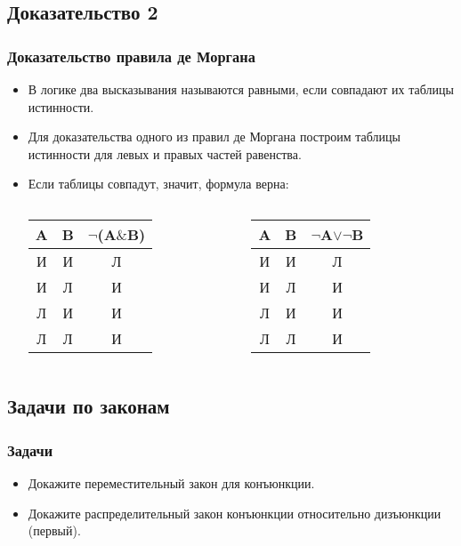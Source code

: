 \documentclass[compress,red]{beamer}
\begin{document}
\subsection{Доказательство 2}
\begin{frame}[fragile]
  \frametitle{Доказательство правила де Моргана}
  \begin{itemize}
    \item В логике два высказывания называются равными, если совпадают их таблицы истинности.
    \item Для доказательства одного из правил де Моргана построим таблицы истинности для левых и правых частей равенства.
    \item Если таблицы совпадут, значит, формула верна:


    \begin{columns}[c]
    \column{1.5in}
      \begin{tabular}{|c|c|c|}
        \hline
        A & B & ${\neg}$(A$\&$B) \\
        \hline
        И & И & Л \\
        \hline
        И & Л & И \\
        \hline
        Л & И & И \\
        \hline
        Л & Л & И \\
        \hline
      \end{tabular}
    \column{1.5in}
      \begin{tabular}{|c|c|c|}
        \hline
        A & B & ${\neg}$A$\vee$${\neg}$B \\
        \hline
        И & И & Л \\
        \hline
        И & Л & И \\
        \hline
        Л & И & И \\
        \hline
        Л & Л & И \\
        \hline
      \end{tabular}
    \end{columns}
    
  \end{itemize}
\end{frame}

\subsection{Задачи по законам}
\begin{frame}[fragile]
  \frametitle{Задачи}
  \begin{itemize}
    \item Докажите переместительный закон для конъюнкции.
    \item Докажите распределительный закон конъюнкции относительно дизъюнкции (первый).
  \end{itemize}
\end{frame}
\end{document}
